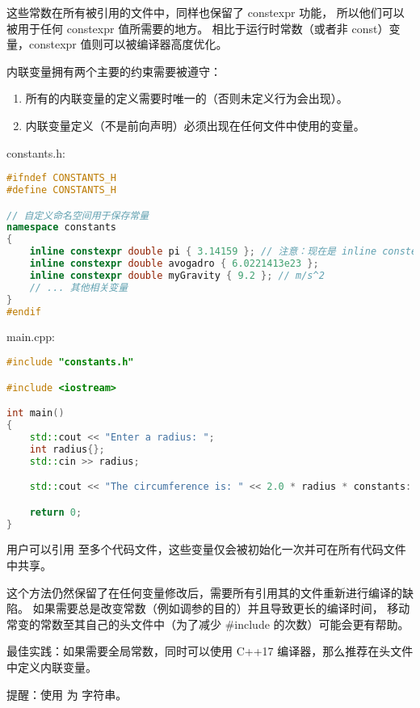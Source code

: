 \documentclass[../../LearnCpp.tex]{subfiles}
\begin{document}
这些常数在所有被引用的文件中，同样也保留了 constexpr 功能，
所以他们可以被用于任何 constexpr 值所需要的地方。
相比于运行时常数（或者非 const）变量，constexpr 值则可以被编译器高度优化。

内联变量拥有两个主要的约束需要被遵守：

\begin{enumerate}
    \item 所有的内联变量的定义需要时唯一的（否则未定义行为会出现）。
    \item 内联变量定义（不是前向声明）必须出现在任何文件中使用的变量。
\end{enumerate}

constants.h:

\begin{lstlisting}[language=C++]
#ifndef CONSTANTS_H
#define CONSTANTS_H

// 自定义命名空间用于保存常量
namespace constants
{
    inline constexpr double pi { 3.14159 }; // 注意：现在是 inline constexpr
    inline constexpr double avogadro { 6.0221413e23 };
    inline constexpr double myGravity { 9.2 }; // m/s^2
    // ... 其他相关变量
}
#endif
\end{lstlisting}

main.cpp:

\begin{lstlisting}[language=C++]
#include "constants.h"

#include <iostream>

int main()
{
    std::cout << "Enter a radius: ";
    int radius{};
    std::cin >> radius;

    std::cout << "The circumference is: " << 2.0 * radius * constants::pi << '\n';

    return 0;
}
\end{lstlisting}

用户可以引用  至多个代码文件，这些变量仅会被初始化一次并可在所有代码文件中共享。

这个方法仍然保留了在任何变量修改后，需要所有引用其的文件重新进行编译的缺陷。
如果需要总是改变常数（例如调参的目的）并且导致更长的编译时间，
移动常变的常数至其自己的头文件中（为了减少 \#include 的次数）可能会更有帮助。

最佳实践：如果需要全局常数，同时可以使用 C++17 编译器，那么推荐在头文件中定义内联变量。

提醒：使用  为  字符串。
\end{document}
